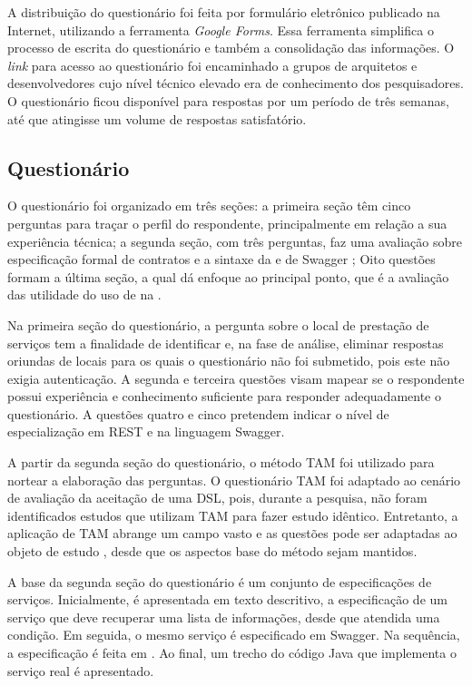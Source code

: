 A distribuição do questionário foi feita por formulário eletrônico publicado na
Internet, utilizando a ferramenta \textit{Google Forms}. Essa ferramenta
simplifica o processo de escrita do questionário e também a consolidação das
informações. O \textit{link} para acesso ao questionário foi encaminhado a
grupos de arquitetos e desenvolvedores cujo nível técnico elevado era de
conhecimento dos pesquisadores. O questionário ficou disponível para respostas
por um período de três semanas, até que atingisse um volume de respostas satisfatório.

\subsection{Questionário}

O questionário foi organizado em três seções: a primeira seção têm cinco
perguntas para traçar o perfil do respondente, principalmente em relação a sua
experiência técnica; a segunda seção, com três perguntas, faz uma avaliação
sobre especificação formal de contratos e a sintaxe da
\neoidl{} e de Swagger \cite{swaggerSite}; 
Oito questões formam a última seção, a qual dá enfoque ao principal ponto, que é
a avaliação das utilidade do uso de \designbycontract{} na \neoidl{}.

Na primeira seção do questionário, a pergunta sobre o local de prestação de serviços tem a finalidade de 
identificar e, na fase de análise, eliminar respostas oriundas de locais para os quais o questionário
não foi submetido, pois este não exigia autenticação. A segunda e terceira
questões visam mapear se o respondente possui experiência e
conhecimento suficiente para responder adequadamente o questionário. A questões
quatro e cinco pretendem indicar o nível de especialização em \wss{} REST e
na linguagem Swagger.

A partir da segunda seção do questionário, o
método TAM foi utilizado para nortear a elaboração das
perguntas.
O questionário TAM foi adaptado ao cenário de avaliação da aceitação de uma DSL,
pois, durante a pesquisa, não foram identificados estudos que utilizam TAM para
fazer estudo idêntico. Entretanto, a aplicação de TAM abrange um campo vasto
e as questões pode ser adaptadas ao objeto de estudo \cite{babar2007evaluating},
desde que os aspectos base do método sejam mantidos.

A base da segunda seção do questionário é um conjunto de especificações de
serviços. Inicialmente, é apresentada em texto
descritivo, a especificação de um serviço que deve recuperar uma lista de
informações, desde que atendida uma condição. Em seguida, o mesmo serviço é especificado em Swagger. Na sequência, a
especificação é feita em \neoidl{}. Ao final, um trecho do código Java que
implementa o serviço real é apresentado.

